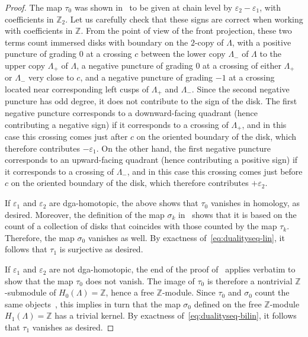 \documentclass[11pt]{amsart}
\theoremstyle{plain}
\theoremstyle{remark}
\numberwithin{equation}{section}
\newcommand{\Z}{\ensuremath{\mathbb{Z}}}
\begin{document}
\begin{proof}
The map $\tau_0$ was shown in~\cite[Proposition~3.2]{BG} to be given at chain level by $\varepsilon_2 - \varepsilon_1$, with coefficients in $\Z_2$. Let us 
carefully check that these signs are correct when working with coefficients in $\Z$.
From the point of view of the front projection, these two terms count immersed disks with boundary on the $2$-copy of $\Lambda$, with a positive puncture of 
grading $0$ at a crossing $c$ between the lower copy $\Lambda_-$ of $\Lambda$ to the upper copy $\Lambda_+$ of $\Lambda$, a negative puncture 
of grading $0$ at a crossing of either $\Lambda_+$ or $\Lambda_-$ very close to $c$, and a negative puncture of grading $-1$ at a crossing 
located near corresponding left cusps of $\Lambda_+$ and $\Lambda_-$. Since the second negative puncture has odd degree, it does not contribute to the
sign of the disk. The first negative puncture corresponds to a downward-facing quadrant (hence contributing a negative sign) if it corresponds to a crossing 
of $\Lambda_+$, and in this case this crossing comes just after $c$ on the oriented boundary of the disk, which therefore contributes $-\varepsilon_1$.
On the other hand, the first negative puncture corresponds to an upward-facing quadrant (hence contributing a positive sign) if it corresponds to a crossing 
of $\Lambda_-$, and in this case this crossing comes just before $c$ on the oriented boundary of the disk, which therefore contributes $+\varepsilon_2$.

If $\varepsilon_1$ and $\varepsilon_2$ are dga-homotopic, the above shows that $\tau_0$ vanishes in homology, as desired. Moreover, the definition of
the map $\sigma_k$ in~\cite{EES} shows that it is based on the count of a collection of disks that coincides with those counted by the map $\tau_k$. Therefore,
the map $\sigma_0$ vanishes as well. By exactness of~\eqref{eq:dualityseq-lin}, it follows that $\tau_1$ is surjective as desired.

If $\varepsilon_1$ and $\varepsilon_2$ are not dga-homotopic, the end of the proof of~\cite[Proposition~3.2]{BG} applies verbatim to show that the map
$\tau_0$ does not vanish. The image of $\tau_0$ is therefore a nontrivial $\Z$-submodule of $H_0(\Lambda) = \Z$, hence a free $\Z$-module.
Since $\tau_0$ and $\sigma_0$ count the same objects~\cite{EES}, this implies in turn that the map $\sigma_0$ defined on the free $\Z$-module 
$H_1(\Lambda) = \Z$ has a trivial kernel. By exactness of~\eqref{eq:dualityseq-bilin}, it follows that $\tau_1$ vanishes as desired.
\end{proof}
\end{document}

